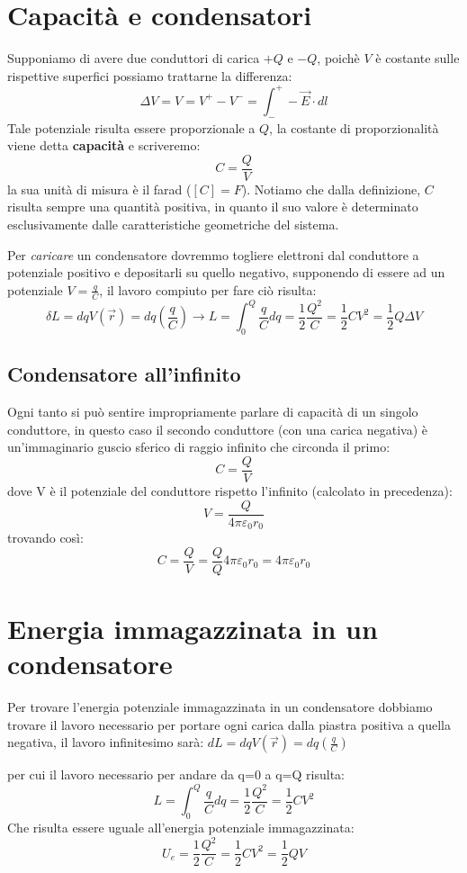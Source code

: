 \documentclass{book}
\begin{document}
\section{Capacit\`a e condensatori}

Supponiamo di avere due conduttori di carica $+Q$ e $-Q$, poichè $V$ è costante sulle rispettive superfici possiamo trattarne la differenza:
\[
\Delta V = V = V^+ -V^- = \int_{-}^{+} -\vec{E} \cdot dl
\]
Tale potenziale risulta essere proporzionale a $Q$, la costante di proporzionalità viene detta \textbf{capacità} e scriveremo:
\[
C=\frac{Q}{V}
\]
la sua unità di misura è il farad ($[C]=F$). Notiamo che dalla definizione, $C$ risulta sempre una quantità positiva, in quanto il suo valore è determinato esclusivamente dalle caratteristiche geometriche del sistema.

Per \textit{caricare} un condensatore dovremmo togliere elettroni dal conduttore a potenziale positivo e depositarli su quello negativo,
supponendo di essere ad un potenziale $V=\frac{q}{C}$, il lavoro compiuto per fare ciò risulta:
\[
\delta L = dq V(\vec{r})= dq (\frac{q}{C}) \rightarrow L = \int_{0}^{Q}\frac{q}{C}dq =\frac{1}{2}\frac{Q^2}{C}=\frac{1}{2}CV^2 = \frac{1}{2} Q \Delta V
\]
\subsection{Condensatore all'infinito}

Ogni tanto si può sentire impropriamente parlare di capacità di un singolo conduttore, in questo caso il secondo conduttore (con una carica negativa) è un'immaginario guscio sferico di raggio infinito che circonda il primo:
$$
C = \frac{Q}{V}
$$
dove V è il potenziale del conduttore rispetto l'infinito (calcolato in precedenza):
$$
V= \frac{Q}{4\pi\varepsilon_0r_0}
$$
trovando così: 
$$
C =\frac{Q}{V} = \frac{Q}{Q} 4\pi\varepsilon_0r_0 = 4\pi\varepsilon_0r_0
$$

\section{Energia immagazzinata in un condensatore}

Per trovare l'energia potenziale immagazzinata in un condensatore dobbiamo trovare il lavoro necessario per portare ogni carica dalla piastra positiva a quella negativa, il lavoro infinitesimo sarà: $dL = dq V(\vec{r})= dq (\frac{q}{C}) $

 per cui il lavoro necessario per andare da q=0 a q=Q risulta: 
 $$
 L = \int_{0}^{Q}\frac{q}{C}dq =\frac{1}{2}\frac{Q^2}{C}=\frac{1}{2}CV^2
 $$
Che risulta essere uguale all'energia potenziale immagazzinata:
$$
U_e=\frac{1}{2}\frac{Q^2}{C} = \frac{1}{2}C V^2= \frac{1}{2}QV
$$ 
\end{document}
